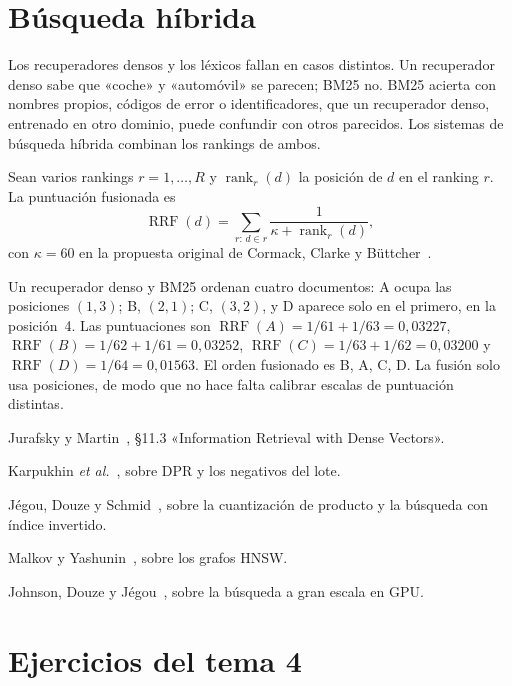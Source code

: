 \section{Búsqueda híbrida}

Los recuperadores densos y los léxicos fallan en casos distintos. Un recuperador denso sabe que «coche» y «automóvil» se parecen; BM25 no. BM25 acierta con nombres propios, códigos de error o identificadores, que un recuperador denso, entrenado en otro dominio, puede confundir con otros parecidos. Los sistemas de búsqueda híbrida combinan los rankings de ambos.

\begin{definicion}\label{def:rrf}
Sean varios rankings $r=1,\dots,R$ y $\operatorname{rank}_r(d)$ la posición de $d$ en el ranking $r$. La puntuación fusionada es
\[
\operatorname{RRF}(d)=\sum_{r:\,d\in r}\frac{1}{\kappa+\operatorname{rank}_r(d)},
\]
con $\kappa=60$ en la propuesta original de Cormack, Clarke y Büttcher~\cite{cormack}.
\end{definicion}

\begin{ejemplo}\label{ej:rrf}
Un recuperador denso y BM25 ordenan cuatro documentos: A ocupa las posiciones $(1,3)$; B, $(2,1)$; C, $(3,2)$, y D aparece solo en el primero, en la posición~4. Las puntuaciones son $\operatorname{RRF}(A)=1/61+1/63=0{,}03227$, $\operatorname{RRF}(B)=1/62+1/61=0{,}03252$, $\operatorname{RRF}(C)=1/63+1/62=0{,}03200$ y $\operatorname{RRF}(D)=1/64=0{,}01563$. El orden fusionado es B, A, C, D. La fusión solo usa posiciones, de modo que no hace falta calibrar escalas de puntuación distintas.
\end{ejemplo}

\begin{lecturas}
\item Jurafsky y Martin~\cite{jm3}, §11.3 «Information Retrieval with Dense Vectors».
\item Karpukhin \emph{et al.}~\cite{dpr}, sobre DPR y los negativos del lote.
\item Jégou, Douze y Schmid~\cite{jegou}, sobre la cuantización de producto y la búsqueda con índice invertido.
\item Malkov y Yashunin~\cite{hnsw}, sobre los grafos HNSW.
\item Johnson, Douze y Jégou~\cite{faiss}, sobre la búsqueda a gran escala en GPU.
\end{lecturas}

\section*{Ejercicios del tema 4}

